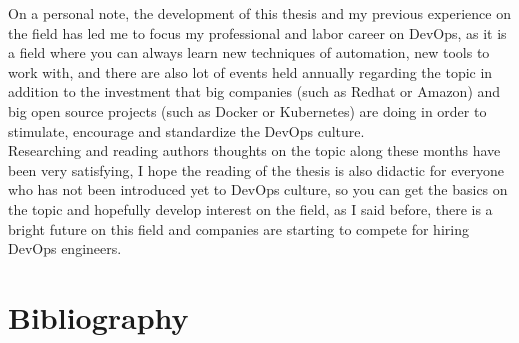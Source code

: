 \documentclass{article}
\begin{document}
On a personal note, the development of this thesis and my previous experience on the field has led me to focus my professional and labor career on DevOps, as it is a field where you can always learn new techniques of automation, new tools to work with, and there are also lot of events held annually regarding the topic in addition to the investment that big companies (such as Redhat or Amazon) and big open source projects (such as Docker or Kubernetes) are doing in order to stimulate, encourage and standardize the DevOps culture.
~\\

Researching and reading authors thoughts on the topic along these months have been very satisfying, I hope the reading of the thesis is also didactic for everyone who has not been introduced yet to DevOps culture, so you can get the basics on the topic and hopefully develop interest on the field, as I said before, there is a bright future on this field and companies are starting to compete for hiring DevOps engineers.

\newpage
{}
\section*{Bibliography}
\nocite{*} %
\printbibliography[heading=none]

\newpage
{}
\printglossaries
\end{document}
